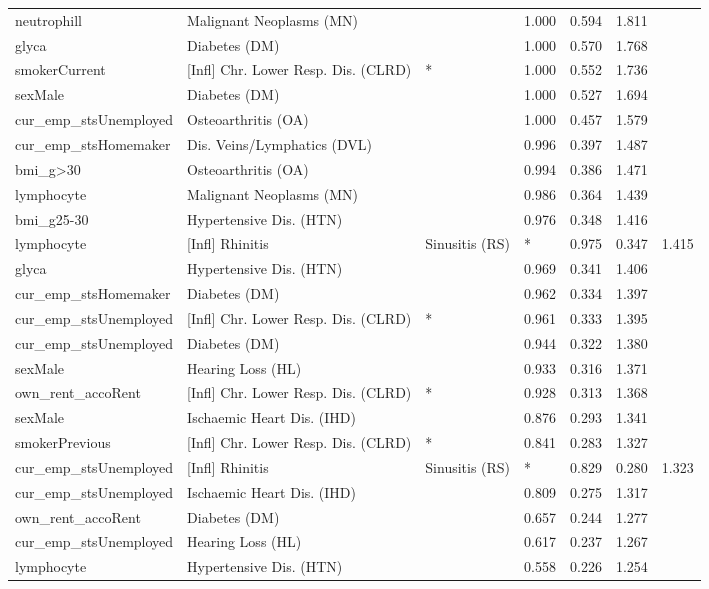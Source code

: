 \begin{tabular}{llllll}
  neutrophill & Malignant Neoplasms (MN) &  & 1.000 & 0.594 & 1.811 \\ 
  glyca & Diabetes (DM) &  & 1.000 & 0.570 & 1.768 \\ 
  smokerCurrent & [Infl] Chr. Lower Resp. Dis. (CLRD) & * & 1.000 & 0.552 & 1.736 \\ 
  sexMale & Diabetes (DM) &  & 1.000 & 0.527 & 1.694 \\ 
  cur_emp_stsUnemployed & Osteoarthritis (OA) &  & 1.000 & 0.457 & 1.579 \\ 
  cur_emp_stsHomemaker & Dis. Veins/Lymphatics (DVL) &  & 0.996 & 0.397 & 1.487 \\ 
  bmi_g>30 & Osteoarthritis (OA) &  & 0.994 & 0.386 & 1.471 \\ 
  lymphocyte & Malignant Neoplasms (MN) &  & 0.986 & 0.364 & 1.439 \\ 
  bmi_g25-30 & Hypertensive Dis. (HTN) &  & 0.976 & 0.348 & 1.416 \\ 
  lymphocyte & [Infl] Rhinitis & Sinusitis (RS) & * & 0.975 & 0.347 & 1.415 \\ 
  glyca & Hypertensive Dis. (HTN) &  & 0.969 & 0.341 & 1.406 \\ 
  cur_emp_stsHomemaker & Diabetes (DM) &  & 0.962 & 0.334 & 1.397 \\ 
  cur_emp_stsUnemployed & [Infl] Chr. Lower Resp. Dis. (CLRD) & * & 0.961 & 0.333 & 1.395 \\ 
  cur_emp_stsUnemployed & Diabetes (DM) &  & 0.944 & 0.322 & 1.380 \\ 
  sexMale & Hearing Loss (HL) &  & 0.933 & 0.316 & 1.371 \\ 
  own_rent_accoRent & [Infl] Chr. Lower Resp. Dis. (CLRD) & * & 0.928 & 0.313 & 1.368 \\ 
  sexMale & Ischaemic Heart Dis. (IHD) &  & 0.876 & 0.293 & 1.341 \\ 
  smokerPrevious & [Infl] Chr. Lower Resp. Dis. (CLRD) & * & 0.841 & 0.283 & 1.327 \\ 
  cur_emp_stsUnemployed & [Infl] Rhinitis & Sinusitis (RS) & * & 0.829 & 0.280 & 1.323 \\ 
  cur_emp_stsUnemployed & Ischaemic Heart Dis. (IHD) &  & 0.809 & 0.275 & 1.317 \\ 
  own_rent_accoRent & Diabetes (DM) &  & 0.657 & 0.244 & 1.277 \\ 
  cur_emp_stsUnemployed & Hearing Loss (HL) &  & 0.617 & 0.237 & 1.267 \\ 
  lymphocyte & Hypertensive Dis. (HTN) &  & 0.558 & 0.226 & 1.254 \\ 

\end{tabular}
